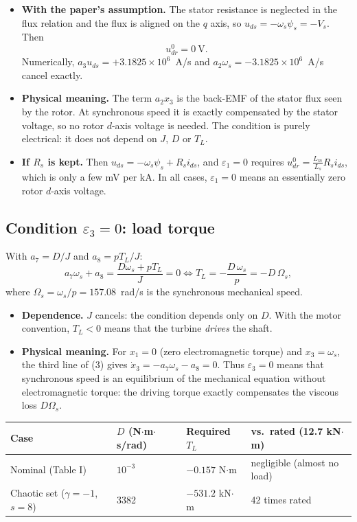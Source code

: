 \documentclass[11pt,a4paper]{article}
\begin{document}
\begin{itemize}
\item \textbf{With the paper's assumption.} The stator resistance is neglected in the flux relation and the flux is aligned on the $q$ axis, so $u_{ds}=-\omega_s\psi_s=-V_s$. Then
\[
\boxed{u^0_{dr}=0\ \text{V}}.
\]
Numerically, $a_3u_{ds}=+3.1825\times10^6$~A/s and $a_2\omega_s=-3.1825\times10^6$~A/s cancel exactly.
\item \textbf{Physical meaning.} The term $a_2x_3$ is the back-EMF of the stator flux seen by the rotor. At synchronous speed it is exactly compensated by the stator voltage, so no rotor $d$-axis voltage is needed. The condition is purely electrical: it does not depend on $J$, $D$ or $T_L$.
\item \textbf{If $R_s$ is kept.} Then $u_{ds}=-\omega_s\psi_s+R_si_{ds}$, and $\varepsilon_1=0$ requires $u^0_{dr}=\frac{L_m}{L_s}R_si_{ds}$, which is only a few mV per kA. In all cases, $\varepsilon_1=0$ means an essentially zero rotor $d$-axis voltage.
\end{itemize}

\subsection{Condition $\varepsilon_3=0$: load torque}
With $a_7=D/J$ and $a_8=pT_L/J$:
\[
a_7\omega_s+a_8=\frac{D\omega_s+pT_L}{J}=0\iff\boxed{T_L=-\frac{D\,\omega_s}{p}=-D\,\Omega_s},
\]
where $\Omega_s=\omega_s/p=157.08$~rad/s is the synchronous mechanical speed.

\begin{itemize}
\item \textbf{Dependence.} $J$ cancels: the condition depends only on $D$. With the motor convention, $T_L<0$ means that the turbine \emph{drives} the shaft.
\item \textbf{Physical meaning.} For $x_1=0$ (zero electromagnetic torque) and $x_3=\omega_s$, the third line of (3) gives $\dot x_3=-a_7\omega_s-a_8=0$. Thus $\varepsilon_3=0$ means that synchronous speed is an equilibrium of the mechanical equation without electromagnetic torque: the driving torque exactly compensates the viscous loss $D\Omega_s$.
\end{itemize}

\begin{center}
\small
\begin{tabular}{llll}
\toprule
Case & $D$ (N$\cdot$m$\cdot$s/rad) & Required $T_L$ & vs.\ rated (12.7 kN$\cdot$m)\\
\midrule
Nominal (Table I) & $10^{-3}$ & $-0.157$ N$\cdot$m & negligible (almost no load)\\
Chaotic set ($\gamma=-1$, $s=8$) & 3382 & $-531.2$ kN$\cdot$m & 42 times rated\\
\bottomrule
\end{tabular}
\end{center}
\end{document}
